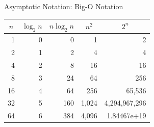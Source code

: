 \documentclass[14pt,aspectratio=1610]{beamer}
\begin{document}
\begin{frame}{Asymptotic Notation: Big-O Notation}
\begin{table}[]
{
\rmfamily
\begin{tabular}{
>{}r r r r r }
\toprule
\multicolumn{1}{c}{\(n\)} & \multicolumn{1}{c}{\(\log_2{n}\)} & \multicolumn{1}{c}{\(n \log_2{n}\)} & \multicolumn{1}{c}{\(n^2\)} & \multicolumn{1}{c}{\(2^n\)} \\
\midrule
1               & 0     &   0                   & 1                & 2             \\
2               & 1     &   2                   & 4                & 4             \\
4               & 2     &   8                   & 16               & 16            \\
8               & 3     &  24                   & 64               & 256           \\
16              & 4     &  64                   & 256              & 65,536        \\
32              & 5     & 160                   & 1,024            & 4,294,967,296 \\
64              & 6     & 384                   & 4,096            & 1.84467e+19   \\
\bottomrule%
\end{tabular}
}
\end{table}
\end{frame}
\end{document}
